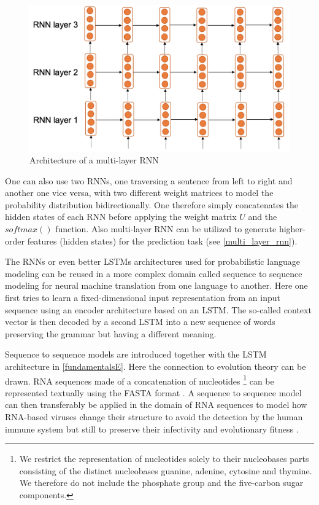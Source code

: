 \begin{figure}[ht]
	\centering
	\includegraphics[width=0.6\linewidth]{figures/multi_layer_rnn.png}
	\caption{Architecture of a multi-layer  \ac{RNN} \cite[p. 87]{Gertz2020}}
	\label{multi_layer_rnn}
\end{figure}

One can also use two \acp{RNN}, one traversing a sentence from left to right and another one vice versa, with two different weight matrices to model the probability distribution bidirectionally. One therefore simply concatenates the hidden states of each \ac{RNN} before applying the weight matrix $U$ and the $softmax()$ function. Also multi-layer \acs{RNN} can be utilized to generate higher-order features (hidden states) for the prediction task (see \autoref{multi_layer_rnn}). \cite{Gertz2020}

The \acp{RNN} or even better \acp{LSTM} architectures used for probabilistic language modeling can be reused in a more complex domain called sequence to sequence modeling for neural machine translation from one language to another. Here one first tries to learn a fixed-dimensional input representation from an input sequence using an encoder architecture based on an \ac{LSTM}. The so-called context vector is then decoded by a second \ac{LSTM} into a new sequence of words preserving the grammar but having a different meaning. \cite{Sutskever2014}

Sequence to sequence models are introduced together with the \ac{LSTM} architecture in \autoref{fundamentalsE}. Here the connection to evolution theory can be drawn. \ac{RNA} sequences made of a concatenation of nucleotides \footnote{We restrict the representation of nucleotides solely to their nucleobases parts consisting of the distinct nucleobases guanine, adenine, cytosine and thymine. We therefore do not include the phosphate group and the five-carbon sugar components.} can be represented textually using the FASTA format \cite{cockBiopythonFreelyAvailable2009}. A sequence to sequence model can then transferably be applied in the domain of \ac{RNA} sequences to model how \ac{RNA}-based viruses change their structure to avoid the detection by the human immune system but still to preserve their infectivity and evolutionary fitness \cite{Hie2021}. 

